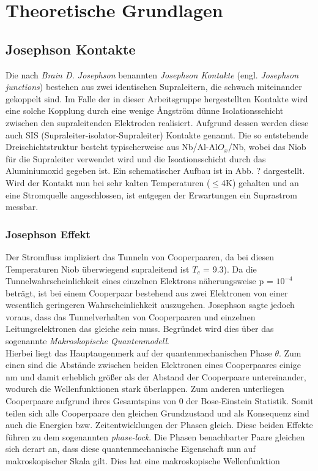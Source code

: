 \chapter{Theoretische Grundlagen}


\section{Josephson Kontakte}
Die nach \textit{Brain D. Josephson} benannten \textit{Josephson Kontakte} (engl. \textit{Josephson junctions}) bestehen aus zwei identischen Supraleitern, die schwach miteinander gekoppelt sind. Im Falle der in dieser Arbeitsgruppe hergestellten Kontakte wird eine solche Kopplung durch eine wenige \r{A}ngström dünne Isolationsschicht zwischen den supraleitenden Elektroden realisiert. Aufgrund dessen werden diese auch SIS (Supraleiter-isolator-Supraleiter) Kontakte genannt. Die so entstehende Dreischichtstruktur besteht typischerweise aus Nb/Al-Al$O_x$/Nb, wobei das Niob für die Supraleiter verwendet wird und die Isoationsschicht durch das Aluminiumoxid gegeben ist. Ein schematischer Aufbau ist in Abb. ? dargestellt. 
Wird der Kontakt nun bei sehr kalten Temperaturen ($\leq$4K) gehalten und an eine Stromquelle angeschlossen, ist entgegen der Erwartungen ein Suprastrom messbar.
        
\subsection{Josephson Effekt}

Der Stromfluss impliziert das Tunneln von Cooperpaaren, da bei diesen Temperaturen Niob überwiegend supraleitend ist  \texttt{${T_c}$} = 9.3). Da die Tunnelwahrscheinlichkeit eines einzelnen Elektrons näherungsweise p = $10^{-4}$ beträgt, ist bei einem Cooperpaar bestehend aus zwei Elektronen von einer wesentlich geringeren Wahrscheinlichkeit auszugehen. Josephson sagte jedoch voraus, dass das Tunnelverhalten von Cooperpaaren und einzelnen Leitungselektronen das gleiche sein muss. Begründet wird dies über das sogenannte \textit{Makroskopische Quantenmodell}. \\
Hierbei liegt das Hauptaugenmerk auf der quantenmechanischen Phase $\theta$. Zum einen sind die Abstände zwischen beiden Elektronen eines Cooperpaares einige nm und damit erheblich größer als der Abstand der Cooperpaare untereinander, wodurch die Wellenfunktionen stark überlappen. Zum anderen unterliegen Cooperpaare aufgrund ihres Gesamtspins von 0 der Bose-Einstein Statistik. Somit teilen sich alle Cooperpaare den gleichen Grundzustand und als Konsequenz sind auch die Energien bzw. Zeitentwicklungen der Phasen gleich. Diese beiden Effekte führen zu dem sogenannten \textit{phase-lock}. Die Phasen benachbarter Paare gleichen sich derart an, dass diese quantenmechanische Eigenschaft nun auf makroskopischer Skala gilt. Dies hat eine makroskopische Wellenfunktion 

